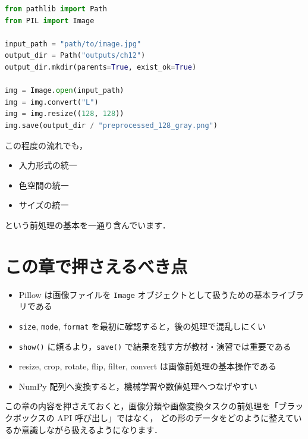 \begin{lstlisting}[style=codecell,language=Python]
from pathlib import Path
from PIL import Image

input_path = "path/to/image.jpg"
output_dir = Path("outputs/ch12")
output_dir.mkdir(parents=True, exist_ok=True)

img = Image.open(input_path)
img = img.convert("L")
img = img.resize((128, 128))
img.save(output_dir / "preprocessed_128_gray.png")
\end{lstlisting}

この程度の流れでも，
\begin{itemize}
\item 入力形式の統一
\item 色空間の統一
\item サイズの統一
\end{itemize}
という前処理の基本を一通り含んでいます．


\section{この章で押さえるべき点}

\begin{itemize}
\item Pillow は画像ファイルを \texttt{Image} オブジェクトとして扱うための基本ライブラリである
\item \texttt{size}, \texttt{mode}, \texttt{format} を最初に確認すると，後の処理で混乱しにくい
\item \texttt{show()} に頼るより，\texttt{save()} で結果を残す方が教材・演習では重要である
\item resize, crop, rotate, flip, filter, convert は画像前処理の基本操作である
\item NumPy 配列へ変換すると，機械学習や数値処理へつなげやすい
\end{itemize}

この章の内容を押さえておくと，画像分類や画像変換タスクの前処理を「ブラックボックスの API 呼び出し」ではなく，
どの形のデータをどのように整えているか意識しながら扱えるようになります．
